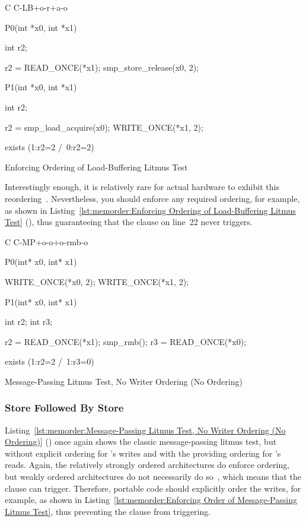 \begin{listing}[tbp]
{ \scriptsize
\begin{verbbox}[\LstLineNo]
C C-LB+o-r+a-o
{
}

P0(int *x0, int *x1)
{
  int r2;

  r2 = READ_ONCE(*x1);
  smp_store_release(x0, 2);
}


P1(int *x0, int *x1)
{
  int r2;

  r2 = smp_load_acquire(x0);
  WRITE_ONCE(*x1, 2);
}

exists (1:r2=2 /\ 0:r2=2)
\end{verbbox}
}
\centering
\theverbbox
\caption{Enforcing Ordering of Load-Buffering Litmus Test}
\label{lst:memorder:Enforcing Ordering of Load-Buffering Litmus Test}
\end{listing}

Interestingly enough, it is relatively rare for actual hardware to
exhibit this reordering~\cite{LucMaranget2017aarch64}.
Nevertheless, you should enforce any required ordering, for example,
as shown in
Listing~\ref{lst:memorder:Enforcing Ordering of Load-Buffering Litmus Test}
(),
thus guaranteeing that the  clause on line~22 never triggers.

\begin{listing}[tbp]
{ \scriptsize
\begin{verbbox}[\LstLineNo]
C C-MP+o-o+o-rmb-o

{
}

P0(int* x0, int* x1) {

  WRITE_ONCE(*x0, 2);
  WRITE_ONCE(*x1, 2);

}

P1(int* x0, int* x1) {

  int r2;
  int r3;

  r2 = READ_ONCE(*x1);
  smp_rmb();
  r3 = READ_ONCE(*x0);

}

exists (1:r2=2 /\ 1:r3=0)
\end{verbbox}
}
\centering
\theverbbox
\caption{Message-Passing Litmus Test, No Writer Ordering (No Ordering)}
\label{lst:memorder:Message-Passing Litmus Test, No Writer Ordering (No Ordering)}
\end{listing}

\subsubsection{Store Followed By Store}
Listing~\ref{lst:memorder:Message-Passing Litmus Test, No Writer Ordering (No Ordering)}
()
once again shows the classic message-passing litmus test, but without
explicit ordering for 's writes and with the 
providing ordering for 's reads.
Again, the relatively strongly ordered architectures do enforce ordering,
but weakly ordered architectures do not necessarily do
so~\cite{JadeAlglave2011ppcmem}, which means that the
 clause can trigger.
Therefore, portable code should explicitly order the writes, for
example, as shown in
Listing~\ref{lst:memorder:Enforcing Order of Message-Passing Litmus Test},
thus preventing the  clause from triggering.

